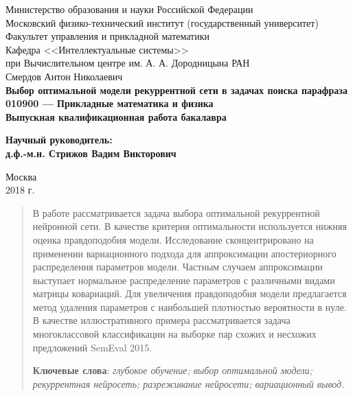 \documentclass[12pt, fleqn, unicode]{article}
\begin{document}
{
\renewcommand{\baselinestretch}{1}
\thispagestyle{empty}
\begin{center}
    \sc
        Министерство образования и науки Российской Федерации\\
        Московский физико-технический институт
        {\rm(государственный университет)}\\
        Факультет управления и прикладной математики\\
        Кафедра <<Интеллектуальные системы>>\\
        при Вычислительном центре им. А. А. Дородницына РАН\\[35mm]
    \rm\large
        Смердов Антон Николаевич\\[10mm]
    \bf\Large
    Выбор оптимальной модели рекуррентной сети в
    задачах поиска парафраза\\[10mm]
    \rm\normalsize
        010900 — Прикладные математика и физика\\[10mm]
    \sc
        Выпускная квалификационная работа бакалавра\\[30mm]
\end{center}
\hfill\parbox{80mm}{
    \begin{flushleft}
    \bf
        Научный руководитель:\\
    \rm
        д.ф.-м.н. Стрижов Вадим Викторович\\[4.9cm]
    \end{flushleft}
}
\begin{center}
    Москва\\
    2018 г.
\end{center}
}

\newpage
\tableofcontents

\newpage
\begin{abstract}
	
В работе рассматривается задача выбора оптимальной рекуррентной нейронной сети. В качестве критерия оптимальности используется нижняя оценка правдоподобия модели. Исследование сконцентрировано на применении вариационного подхода для аппроксимации апостериорного распределения параметров модели. Частным случаем аппроксимации выступает нормальное распределение параметров с различными видами матрицы ковариаций. Для увеличения правдоподобия модели предлагается метод удаления параметров с наибольшей плотностью вероятности в нуле. В качестве иллюстративного примера рассматривается задача многоклассовой классификации на выборке пар схожих и несхожих предложений SemEval 2015.

  \bigskip
    \textbf{Ключевые слова}: \emph{глубокое обучение; выбор оптимальной модели; рекуррентная нейросеть; разреживание нейросети; вариационный вывод.}
\end{abstract}
\end{document}
